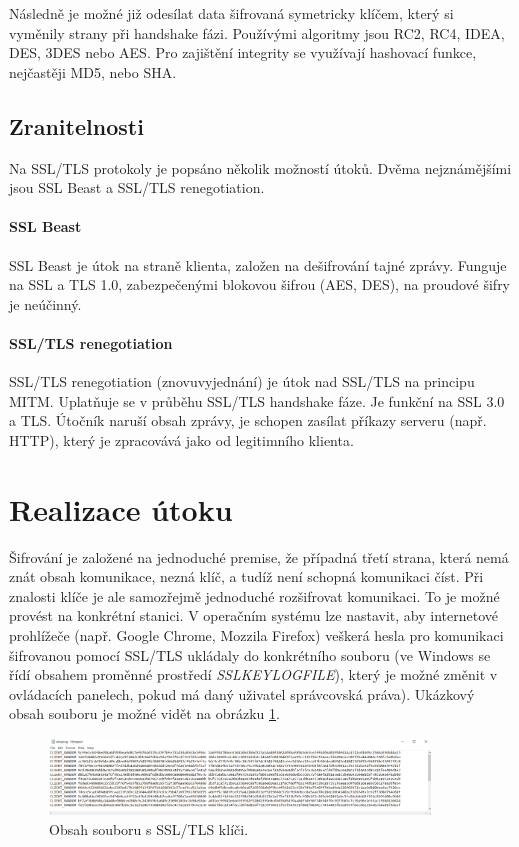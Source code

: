 \documentclass[10pt,a4paper,titlepage]{article}
\begin{document}
  Následně je možné již odesílat data šifrovaná symetricky klíčem, který si vyměnily
  strany při handshake fázi. Používými algoritmy jsou RC2, RC4, IDEA, DES, 3DES nebo AES.
  Pro zajištění integrity se využívají hashovací funkce, nejčastěji MD5, nebo SHA.

  \subsection*{Zranitelnosti}
  Na SSL/TLS protokoly je popsáno několik možností útoků. Dvěma nejznámějšími
  jsou SSL Beast a SSL/TLS renegotiation.
  
  \paragraph{SSL Beast}
  SSL Beast je útok na straně klienta, založen na dešifrování tajné zprávy.
  Funguje na SSL a TLS 1.0, zabezpečenými blokovou šifrou (AES, DES), na proudové
  šifry je neúčinný. \cite{sslbeast}

  \paragraph{SSL/TLS renegotiation}
  SSL/TLS renegotiation (znovuvyjednání) je útok nad SSL/TLS na principu MITM.
  Uplatňuje se v průběhu SSL/TLS handshake fáze. Je funkční na SSL 3.0 a TLS.
  Útočník naruší obsah zprávy, je schopen zasílat příkazy serveru (např. HTTP),
  který je zpracovává jako od legitimního klienta. \cite{sslrenegotiation}

  
  \section*{Realizace útoku}

  Šifrování je založené na jednoduché premise, že případná třetí strana, která nemá
  znát obsah komunikace, nezná klíč, a tudíž není schopná komunikaci číst.
  Při znalosti klíče je ale samozřejmě jednoduché rozšifrovat komunikaci. To je možné
  provést na konkrétní stanici. V operačním systému lze nastavit, aby internetové
  prohlížeče (např. Google Chrome, Mozzila Firefox) veškerá hesla pro komunikaci 
  šifrovanou pomocí SSL/TLS ukládaly do konkrétního souboru (ve Windows
  se řídí obsahem proměnné prostředí {\it SSLKEYLOGFILE}), který je možné změnit
  v ovládacích panelech, pokud má daný uživatel správcovská práva). Ukázkový
  obsah souboru je možné vidět na obrázku \ref{fig:sslkeylog}.

  \begin{figure}[h!]
    \begin{center}
      \includegraphics[width=0.9\textwidth]{sslkeylog.png}
      \caption{Obsah souboru s SSL/TLS klíči.\label{fig:sslkeylog}}
    \end{center}    
  \end{figure}
  
\end{document}
